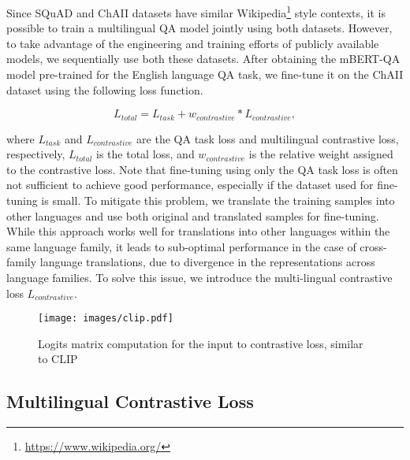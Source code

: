 \documentclass[11pt]{article}
\begin{document}
Since SQuAD \cite{rajpurkar2016SQuAD} and ChAII \cite{ChAII} datasets have similar Wikipedia\footnote{\url{https://www.wikipedia.org/}} style contexts, it is possible to train a multilingual QA model jointly using both datasets. However, to take advantage of the engineering and training efforts of publicly available models, we sequentially use both these datasets. After obtaining the mBERT-QA model pre-trained for the English language QA task, we fine-tune it on the ChAII dataset using the following loss function.

\begin{equation}
   L_{total} = L_{task} + w_{contrastive} * L_{contrastive},
\end{equation}

\noindent where $L_{task}$ and $L_{contrastive}$ are the QA task loss and multilingual contrastive loss, respectively, $L_{total}$ is the total loss, and $w_{contrastive}$ is the relative weight assigned to the contrastive loss. Note that fine-tuning using only the QA task loss is often not sufficient to achieve good performance, especially if the dataset used for fine-tuning is small. To mitigate this problem, we translate the training samples into other languages and use both original and translated samples for fine-tuning. While this approach works well for translations into other languages within the same language family, it leads to sub-optimal performance in the case of cross-family language translations, due to divergence in the representations across language families. To solve this issue, we introduce the multi-lingual contrastive loss $L_{contrastive}$.
 
\begin{figure*}[ht]
\centering
   \texttt{[image: images/clip.pdf]}
   \caption{Logits matrix computation for the input to contrastive loss, similar to CLIP \cite{radford2021learning}}
   \label{fig:contrastive}
\end{figure*}

\subsection{Multilingual Contrastive Loss}
\label{sec:contrastive}
\end{document}
